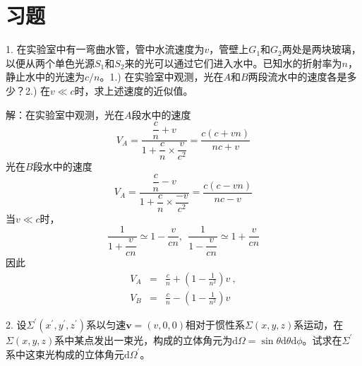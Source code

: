 \documentclass[12pt,a4paper]{article}
\renewcommand{\vec}[1]{\boldsymbol{#1}}
\newcommand{\dif}{\mathrm{d}}
\begin{document}
\section{习题}
1. 在实验室中有一弯曲水管，管中水流速度为$v$，管壁上$G_1$和$G_2$两处是两块玻璃，以便从两个单色光源$S_1$和$S_2$来的光可以通过它们进入水中。已知水的折射率为$n$，静止水中的光速为$c/n$。1.) 在实验室中观测，光在$A$和$B$两段流水中的速度各是多少？2.) 在$v\ll c$时，求上述速度的近似值。

解：在实验室中观测，光在$A$段水中的速度
\begin{equation*}
V_A = \dfrac{\dfrac{c}{n} +v}{1+\dfrac{c}{n}\times \dfrac{v}{c^2}} = \dfrac{c(c+vn)}{nc +v}
\end{equation*}
光在$B$段水中的速度
\begin{equation*}
V_A = \dfrac{\dfrac{c}{n} -v}{1+\dfrac{c}{n}\times \dfrac{-v}{c^2}} = \dfrac{c(c-vn)}{nc-v}
\end{equation*}
当$v \ll c$时，
\begin{equation*}
\frac{1}{1+\dfrac{v}{cn}} \simeq 1 -\frac{v}{cn} ,~~ \frac{1}{1-\dfrac{v}{cn}} \simeq 1 +\frac{v}{cn} 
\end{equation*}
因此
\begin{eqnarray*}
V_A &=& \frac{c}{n} +\left(1-\frac{1}{n^2}\right) v ~,\\
V_B &=& \frac{c}{n} -\left(1-\frac{1}{n^2}\right) v
\end{eqnarray*}

2. 设$\Sigma^{\prime}(x^{\prime}, y^{\prime}, z^{\prime})$系以匀速$\vec{v} = (v, 0, 0)$相对于惯性系$\Sigma(x, y, z)$系运动，在$\Sigma(x, y, z)$系中某点发出一束光，构成的立体角元为$\dif \Omega = \sin \theta \dif \theta \dif \phi$。试求在$\Sigma^{\prime}$系中这束光构成的立体角元$\dif \Omega^{\prime}$。
\end{document}
